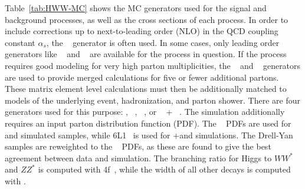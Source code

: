 Table~\ref{tab:HWW-MC} shows the MC generators used for the signal and background processes, as well as the cross sections of each process. In order to include corrections up to next-to-leading order (NLO) in the QCD coupling constant $\alpha_{s}$, the \POWHEG~\cite{powheg1} generator is often used. In some cases, only leading order generators like \ACERMC~\cite{acermc} and \GGTOVV~\cite{gg2vv} are available for the process in question. If the process requires good modeling for very high parton multiplicities, the \SHERPA~\cite{sherpa} and \ALPGEN~\cite{alpgen} generators are used to provide merged calculations for five or fewer additional partons. These matrix element level calculations must then be additionally matched to models of the underlying event, hadronization, and parton shower. There are four generators used for this purpose: \SHERPA, ~\cite{pythia6}, ~\cite{pythia8}, or \HERWIG~\cite{herwig} + \JIMMY~\cite{jimmy}. The simulation additionally requires an input parton distribution function (PDF). The ~\cite{ct10} PDFs are used for \SHERPA and \POWHEG simulated samples, while \CTEQ6L1~\cite{cteq} is used for \ALPGEN+\HERWIG and \ACERMC simulations. The Drell-Yan samples are reweighted to the \MRST~\cite{mrst} PDFs, as these are found to give the best agreement between data and simulation. The branching ratio for Higgs to $WW^*$ and $ZZ^*$ is computed with \PROPHECY4f~\cite{prophecy4f}, while the width of all other decays is computed with \HDECAY\cite{hdecay}. 

